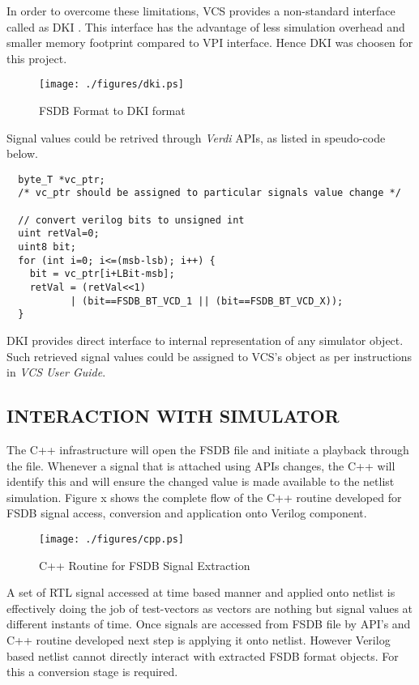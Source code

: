 In order to overcome these limitations, VCS provides a non-standard interface called as DKI . This interface has the advantage of less simulation overhead and smaller memory footprint compared to VPI interface. Hence DKI was choosen for this project.

\begin{figure}[h]
\centering
\texttt{[image: ./figures/dki.ps]}
\caption{FSDB Format to DKI format}
\label{fig:dki.eps}
\end{figure}

Signal values could be retrived through {\it Verdi} APIs, as listed in speudo-code below.
\begin{verbatim}
  byte_T *vc_ptr;
  /* vc_ptr should be assigned to particular signals value change */

  // convert verilog bits to unsigned int
  uint retVal=0;
  uint8 bit;
  for (int i=0; i<=(msb-lsb); i++) {
    bit = vc_ptr[i+LBit-msb];
    retVal = (retVal<<1)
           | (bit==FSDB_BT_VCD_1 || (bit==FSDB_BT_VCD_X));
  } 
\end{verbatim}
DKI provides direct interface to internal representation of any simulator object. Such retrieved signal values could be assigned to VCS's object as per instructions in {\it VCS User Guide}\cite[Section~C~Language~Interface>~Direct~C]{VCS:vcs.pdf}.

\subsection{INTERACTION WITH SIMULATOR}

The C++ infrastructure will open the FSDB file and initiate a playback through the file. Whenever a signal that is attached using APIs changes, the C++ will identify this and will ensure the changed value is made available to the netlist simulation.  Figure x shows the complete flow of the C++ routine developed for FSDB signal access, conversion and application onto Verilog component.


\begin{figure}[h]
\centering
\texttt{[image: ./figures/cpp.ps]}
\caption{C++ Routine for FSDB Signal Extraction}
\label{fig:cpp.eps}
\end{figure}

A set of RTL signal accessed at time based manner and applied onto netlist is effectively doing the job of test-vectors as vectors are nothing but signal values at different instants of time.
Once signals are accessed from FSDB file by API's and C++ routine developed next step is applying it onto netlist. However Verilog based netlist cannot directly interact with extracted FSDB format objects. For this a conversion stage is required.  

